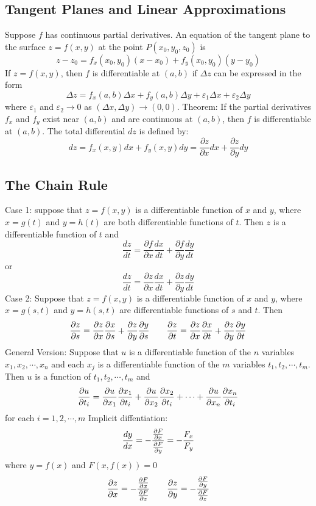\documentclass{article}
\begin{document}
    \subsection{Tangent Planes and Linear Approximations}
    \begin{outline}
        \1 Suppose $f$ has continuous partial derivatives. An equation of the tangent plane to the surface \(z=f(x,y)\) at the point \(P(x_0,y_0,z_0)\) is \[z-z_0=f_x(x_0,y_0)(x-x_0)+f_y(x_0,y_0)(y-y_0)\]
        \1 If \(z=f(x,y)\), then $f$ is differentiable at \((a,b)\) if \(\Delta z\) can be expressed in the form \[\Delta z=f_x(a,b)\Delta x+f_y(a,b)\Delta y+\varepsilon_1\Delta x+\varepsilon_2\Delta y\] where \(\varepsilon_1\) and \(\varepsilon_2\to 0\) as \((\Delta x,\Delta y)\to(0,0)\). 
        \1 Theorem: If the partial derivatives \(f_x\) and \(f_y\) exist near \((a,b)\) and are continuous at \((a,b)\), then $f$ is differentiable at \((a,b)\). 
        \1 The total differential $dz$ is defined by: \[dz=f_x(x,y)dx+f_y(x,y)dy=\dfrac{\partial z}{\partial x}dx+\dfrac{\partial z}{\partial y}dy\]

    \end{outline}
    \subsection{The Chain Rule}
    \begin{outline}
        \1 Case 1: suppose that \(z=f(x,y)\) is a differentiable function of $x$ and $y$, where \(x=g(t)\) and \(y=h(t)\) are both differentiable functions of $t$. Then $z$ is a differentiable function of $t$ and \[\dfrac{dz}{dt}=\dfrac{\partial f}{\partial x}\dfrac{dx}{dt}+\dfrac{\partial f}{\partial y}\dfrac{dy}{dt}\] or \[\dfrac{dz}{dt}=\dfrac{\partial z}{\partial x}\dfrac{dx}{dt}+\dfrac{\partial z}{\partial y}\dfrac{dy}{dt}\]
        \1 Case 2: Suppose that \(z=f(x,y)\) is a differentiable function of $x$ and $y$, where \(x=g(s,t)\) and \(y=h(s,t)\) are differentiable functions of $s$ and $t$. Then \[\pdv{z}{s}=\pdv{z}{x}\pdv{x}{s}+\pdv{z}{y}\pdv{y}{s}\qquad\pdv{z}{t}=\pdv{z}{x}\pdv{x}{t}+\pdv{z}{y}\pdv{y}{t}\]
        \1 General Version: Suppose that $u$ is a differentiable function of the $n$ variables \(x_1,x_2,\cdots,x_n\) and each \(x_j\) is a differentiable function of the $m$ variables \(t_1,t_2,\cdots,t_m\). Then $u$ is a function of \(t_1,t_2,\cdots,t_m\) and \[\pdv{u}{t_i}=\pdv{u}{x_1}\pdv{x_1}{t_i}+\pdv{u}{x_2}\pdv{x_2}{t_i}+\cdots+\pdv{u}{x_n}\pdv{x_n}{t_i}\] for each \(i=1,2,\cdots,m\)
        \1 Implicit diffentiation: \[\dfrac{dy}{dx}=-\dfrac{\pdv{F}{x}}{\pdv{F}{y}}=-\dfrac{F_x}{F_y}\] where \(y=f(x)\) and \(F(x,f(x))=0\)
        \1 \[\pdv{z}{x}=-\dfrac{\pdv{F}{x}}{\pdv{F}{z}}\qquad\pdv{z}{y}=-\dfrac{\pdv{F}{y}}{\pdv{F}{z}}\]


    \end{outline}
\end{document}
